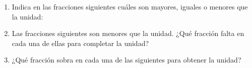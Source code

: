 \documentclass[10pt,twoside]{article}
\begin{document}
\begin{enumerate}
\begin{enumerate}
\end{enumerate}
\item Indica en las fracciones siguientes cuáles son mayores, iguales o menores que la unidad:
\begin{enumerate}
\end{enumerate}
\item Las fracciones siguientes son menores que la unidad. ¿Qué
fracción falta en cada una de ellas para completar la unidad?
\begin{enumerate}
\end{enumerate}
\item ¿Qué fracción sobra en cada una de las siguientes para obtener la unidad?
\begin{enumerate}
\end{enumerate}
\end{enumerate}
\end{document}
